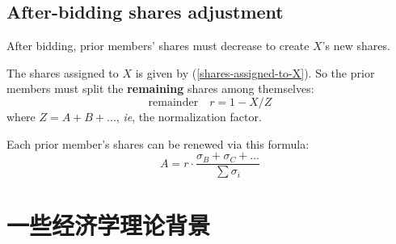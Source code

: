 \documentclass[12pt, orivec]{article}
\newcommand{\cc}[2]{#1}
\newcommand{\cc}[2]{#2}
\begin{document}
\secttoc
\subsection{After-bidding shares adjustment}

After bidding, prior members' shares must decrease to create $X$'s new shares.

The shares assigned to $X$ is given by (\ref{shares-assigned-to-X}).  So the prior members must split the \textbf{remaining} shares among themselves:
\begin{equation}
\boxed{\mbox{remainder}} \quad r = 1 - X / Z
\end{equation}
where $Z = A + B + ...$, \textit{ie}, the normalization factor.

Each prior member's shares can be renewed via this formula:
\begin{equation}
A = r \cdot \frac{\sigma_B + \sigma_C + ...}{\sum \sigma_i}
\end{equation}

\secttoc
\section{\cc{一些经济学理论背景}{Some economic-theoretical background}}
\end{document}
